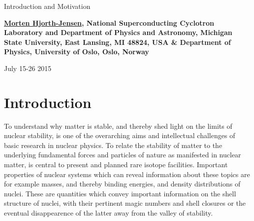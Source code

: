 \documentclass[%
twoside,                 %
final,                   %
10pt]{article}
\begin{document}






\thispagestyle{empty}

\begin{center}
{\LARGE\bf
\begin{spacing}{1.25}
Introduction and Motivation
\end{spacing}
}
\end{center}


\begin{center}
{\bf \href{{http://computationalphysics.no}}{Morten Hjorth-Jensen}, National Superconducting Cyclotron Laboratory and Department of Physics and Astronomy, Michigan State University, East Lansing, MI 48824, USA {\&} Department of Physics, University of Oslo, Oslo, Norway${}^{}$} \\ [0mm]
\end{center}

    \begin{center}
\end{center}
    

\begin{center} %
July 15-26 2015
\end{center}

\vspace{1cm}


\tableofcontents


\vspace{1cm} %




\section{Introduction}

To understand why matter is stable, and thereby shed light on the limits of 
nuclear stability, is one of the 
overarching aims and intellectual challenges 
of basic research in nuclear physics. To relate the stability of matter
to the underlying fundamental forces and particles of nature as manifested in nuclear matter, is central
to present and planned rare isotope facilities. 
Important properties of nuclear systems which can reveal information about these topics 
are for example masses, and thereby binding energies, and density distributions of nuclei.  
These are quantities which convey important information on 
the shell structure of nuclei, with their 
pertinent magic numbers and shell closures or the  eventual disappearence of the latter 
away from  the valley of stability.
\end{document}
